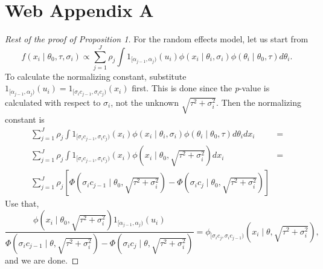 \section*{Web Appendix A}

\begin{proof}[Rest of the proof of Proposition 1]
For the random effects model, let us start from
\[
f(x_{i}\mid\theta_{0},\tau,\sigma_{i})\propto\sum_{j=1}^{J}\rho_{j}\int1_{[\alpha_{j-1},\alpha_{j})}(u_{i})\phi(x_{i}\mid\theta_{i},\sigma_{i})\phi(\theta_{i}\mid\theta_{0},\tau)d\theta_{i}.
\]
To calculate the normalizing constant, substitute $1_{[\alpha_{j-1},\alpha_{j})}(u_{i})=1_{[\sigma_{i}c_{j-1},\sigma_{i}c_{j})}(x_{i})$
first. This is done since the \emph{p}-value is calculated with respect
to $\sigma_{i}$, not the unknown $\sqrt{\tau^{2}+\sigma_{i}^{2}}$.
Then the normalizing constant is
\begin{eqnarray*}
\sum_{j=1}^{J}\rho_{j}\int1_{[\sigma_{i}c_{j-1},\sigma_{i}c_{j})}(x_{i})\phi(x_{i}\mid\theta_{i},\sigma_{i})\phi(\theta_{i}\mid\theta_{0},\tau)d\theta_{i}dx_{i} & =\\
\sum_{j=1}^{J}\rho_{j}\int1_{[\sigma_{i}c_{j-1},\sigma_{i}c_{j})}(x_{i})\phi(x_{i}\mid\theta_{0},\sqrt{\tau^{2}+\sigma_{i}^{2}})dx_{i} & =\\
\sum_{j=1}^{J}\rho_{j}\left[\Phi(\sigma_{i}c_{j-1}\mid\theta_{0},\sqrt{\tau^{2}+\sigma_{i}^{2}})-\Phi(\sigma_{i}c_{j}\mid\theta_{0},\sqrt{\tau^{2}+\sigma_{i}^{2}})\right]
\end{eqnarray*}
Use that,
\[
\frac{\phi(x_{i}\mid\theta_{0},\sqrt{\tau^{2}+\sigma_{i}^{2}})1_{[\alpha_{j-1},\alpha_{j})}(u_{i})}{\Phi(\sigma_{i}c_{j-1}\mid\theta,\sqrt{\tau^{2}+\sigma_{i}^{2}})-\Phi(\sigma_{i}c_{j}\mid\theta,\sqrt{\tau^{2}+\sigma_{i}^{2}})}=\phi_{[\sigma_{i}c_{j},\sigma_{i}c_{j-1})}(x_{i}\mid\theta,\sqrt{\tau^{2}+\sigma_{i}^{2}}),
\]
and we are done.
\end{proof}